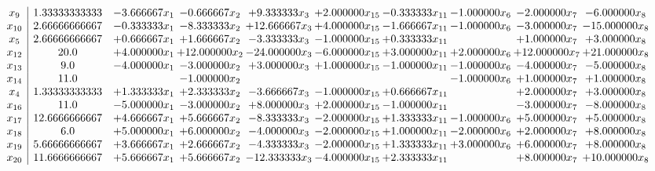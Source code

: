 \documentclass[10pt]{article}
\begin{document}
 \[\begin{array}{c| c c@{\hskip 2pt} c@{\hskip 2pt} c@{\hskip 2pt} c@{\hskip 2pt} c@{\hskip 2pt} c@{\hskip 2pt} c@{\hskip 2pt} c@{\hskip 2pt} }
 x_{9}   &  1.33333333333 & -3.666667 x_{1} & -0.666667 x_{2} & + 9.333333 x_{3} & + 2.000000 x_{15} & -0.333333 x_{11} & -1.000000 x_{6} & -2.000000 x_{7} & -6.000000 x_{8}\\
 x_{10}   &  2.66666666667 & -0.333333 x_{1} & -8.333333 x_{2} & + 12.666667 x_{3} & + 4.000000 x_{15} & -1.666667 x_{11} & -1.000000 x_{6} & -3.000000 x_{7} & -15.000000 x_{8}\\
 x_{5}   &  2.66666666667 & + 0.666667 x_{1} & + 1.666667 x_{2} & -3.333333 x_{3} & -1.000000 x_{15} & + 0.333333 x_{11} &   & + 1.000000 x_{7} & + 3.000000 x_{8}\\
 x_{12}   &  20.0 & + 4.000000 x_{1} & + 12.000000 x_{2} & -24.000000 x_{3} & -6.000000 x_{15} & + 3.000000 x_{11} & + 2.000000 x_{6} & + 12.000000 x_{7} & + 21.000000 x_{8}\\
 x_{13}   &  9.0 & -4.000000 x_{1} & -3.000000 x_{2} & + 3.000000 x_{3} & + 1.000000 x_{15} & -1.000000 x_{11} & -1.000000 x_{6} & -4.000000 x_{7} & -5.000000 x_{8}\\
 x_{14}   &  11.0  &   & -1.000000 x_{2} &    &    &   & -1.000000 x_{6} & + 1.000000 x_{7} & + 1.000000 x_{8}\\
 x_{4}   &  1.33333333333 & + 1.333333 x_{1} & + 2.333333 x_{2} & -3.666667 x_{3} & -1.000000 x_{15} & + 0.666667 x_{11} &   & + 2.000000 x_{7} & + 3.000000 x_{8}\\
 x_{16}   &  11.0 & -5.000000 x_{1} & -3.000000 x_{2} & + 8.000000 x_{3} & + 2.000000 x_{15} & -1.000000 x_{11} &   & -3.000000 x_{7} & -8.000000 x_{8}\\
 x_{17}   &  12.6666666667 & + 4.666667 x_{1} & + 5.666667 x_{2} & -8.333333 x_{3} & -2.000000 x_{15} & + 1.333333 x_{11} & -1.000000 x_{6} & + 5.000000 x_{7} & + 5.000000 x_{8}\\
 x_{18}   &  6.0 & + 5.000000 x_{1} & + 6.000000 x_{2} & -4.000000 x_{3} & -2.000000 x_{15} & + 1.000000 x_{11} & -2.000000 x_{6} & + 2.000000 x_{7} & + 8.000000 x_{8}\\
 x_{19}   &  5.66666666667 & + 3.666667 x_{1} & + 2.666667 x_{2} & -4.333333 x_{3} & -2.000000 x_{15} & + 1.333333 x_{11} & + 3.000000 x_{6} & + 6.000000 x_{7} & + 8.000000 x_{8}\\
 x_{20}   &  11.6666666667 & + 5.666667 x_{1} & + 5.666667 x_{2} & -12.333333 x_{3} & -4.000000 x_{15} & + 2.333333 x_{11} &   & + 8.000000 x_{7} & + 10.000000 x_{8}\\

\end{array}\]
\end{document}
